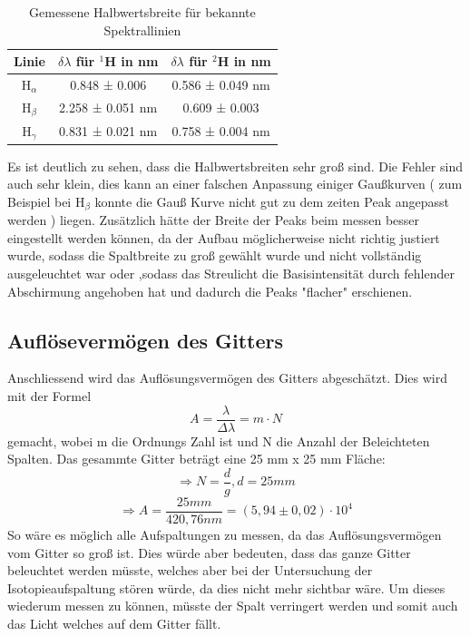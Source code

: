 \begin{table}[htbp]
    \centering
    \begin{tabular}{|c|c|c|}
    Linie & $\delta\lambda$ für $^1$H in nm & $\delta\lambda$ für $^2$H in nm \\
    \hline
        H$_\alpha$ & 0.848 ± 0.006 & 0.586 ± 0.049 nm \\
        H$_\beta$ & 2.258 ± 0.051 nm & 0.609 ± 0.003 \\
        H$_\gamma$ & 0.831 ± 0.021 nm & 0.758 ± 0.004 nm
    \end{tabular}
    \caption{Gemessene Halbwertsbreite für bekannte Spektrallinien}
    \label{tab:gemhalb}
\end{table}
Es ist deutlich zu sehen, dass die Halbwertsbreiten sehr groß sind. 
Die Fehler sind auch sehr klein, dies kann an einer falschen Anpassung einiger Gaußkurven ( zum Beispiel bei H$_\beta$ konnte die Gauß Kurve nicht gut zu dem zeiten Peak angepasst werden ) liegen.
Zusätzlich hätte der Breite der Peaks beim messen besser eingestellt werden können, da der Aufbau möglicherweise nicht richtig justiert wurde, sodass die Spaltbreite zu groß gewählt wurde und nicht vollständig ausgeleuchtet war oder ,sodass das Streulicht die Basisintensität durch fehlender Abschirmung angehoben hat und dadurch die Peaks "flacher" erschienen.


\subsection{Auflösevermögen des Gitters}

Anschliessend wird das Auflösungsvermögen des Gitters abgeschätzt. 
Dies wird mit der Formel 
\begin{equation}
    A = \frac{\lambda}{\Delta\lambda} = m \cdot N
\end{equation}
gemacht, wobei m die Ordnungs Zahl ist und N die Anzahl der Beleichteten Spalten. 
Das gesammte Gitter beträgt eine 25 mm x 25 mm Fläche:
\begin{equation}
    \Rightarrow N = \frac{d}{g}, d = 25mm
\end{equation}
\begin{equation}
    \Rightarrow A = \frac{25mm}{420,76nm} = (5,94 \pm 0,02) \cdot 10^4
\end{equation}
So wäre es möglich alle Aufspaltungen zu messen, da das Auflösungsvermögen vom Gitter so groß ist. 
Dies würde aber bedeuten, dass das ganze Gitter beleuchtet werden müsste, welches aber bei der Untersuchung der Isotopieaufspaltung stören würde, da dies nicht mehr sichtbar wäre.
Um dieses wiederum messen zu können, müsste der Spalt verringert werden und somit auch das Licht welches auf dem Gitter fällt.
